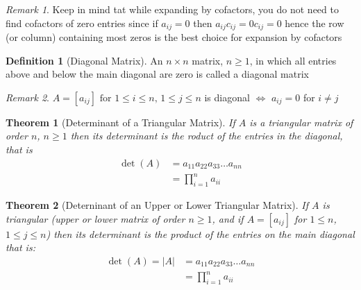 \documentclass{jhwhw}
\newtheorem{theorem}{Theorem}
\theoremstyle{definition}
\newtheorem{definition}{Definition}
\theoremstyle{remark}
\newtheorem*{remark}{Remark}
\theoremstyle{example}
\begin{document}
\begin{remark} Keep in mind tat while expanding by cofactors, you do not need to find cofactors of zero entries since if \(a_{ij} = 0\) then \(a_{ij} c_{ij} = 0 c_{ij} = 0\) hence the row (or column) containing most zeros is the best choice for expansion by cofactors \end{remark}
\begin{definition}[Diagonal Matrix] An \(n \times n\) matrix, \(n \geq 1\), in which all entries above and below the main diagonal are zero is called a diagonal matrix \end{definition}
\begin{remark} \(A = [a_{ij}] \text{ for } 1 \leq i \leq n, \, 1 \leq j \leq n\) is diagonal \(\Leftrightarrow\) \(a_{ij} = 0\) for \(i \neq j\) \end{remark}
\begin{theorem}[Determinant of a Triangular Matrix] If \(A\) is a triangular matrix of order \(n\), \(n \geq 1\) then its determinant is the roduct of the entries in the diagonal, that is 
\begin{align*} \det(A) &= a_{11} a_{22} a_{33} \ldots a_{nn}\\
&= \prod_{i=1}^{n} a_{ii}  \end{align*} \end{theorem}
\begin{theorem}[Deterninant of an Upper or Lower Triangular Matrix] If \(A\) is triangular (upper or lower matrix of order \(n \geq 1\), and if \(A = [a_{ij}]\) for \(1 \leq n\), \(1 \leq j \leq n\))
then its determinant is the product of the entries on the main diagonal that is: 
\begin{align*} \det(A) = |A| &= a_{11} a_{22} a_{33} \ldots a_{nn}\\
&= \prod_{i=1}^{n} a_{ii} \end{align*}\end{theorem}
\end{document}
